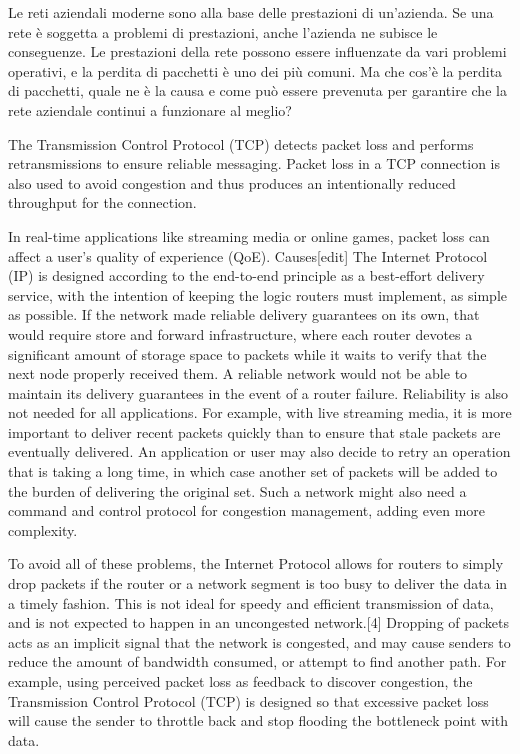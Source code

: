 Le reti aziendali moderne sono alla base delle prestazioni di un’azienda. Se una rete è soggetta a problemi di prestazioni, anche l’azienda ne subisce le conseguenze. Le prestazioni della rete possono essere influenzate da vari problemi operativi, e la perdita di pacchetti è uno dei più comuni. Ma che cos’è la perdita di pacchetti, quale ne è la causa e come può essere prevenuta per garantire che la rete aziendale continui a funzionare al meglio?

The Transmission Control Protocol (TCP) detects packet loss and performs retransmissions to ensure reliable messaging. Packet loss in a TCP connection is also used to avoid congestion and thus produces an intentionally reduced throughput for the connection.

In real-time applications like streaming media or online games, packet loss can affect a user's quality of experience (QoE).
Causes[edit]
The Internet Protocol (IP) is designed according to the end-to-end principle as a best-effort delivery service, with the intention of keeping the logic routers must implement, as simple as possible. If the network made reliable delivery guarantees on its own, that would require store and forward infrastructure, where each router devotes a significant amount of storage space to packets while it waits to verify that the next node properly received them. A reliable network would not be able to maintain its delivery guarantees in the event of a router failure. Reliability is also not needed for all applications. For example, with live streaming media, it is more important to deliver recent packets quickly than to ensure that stale packets are eventually delivered. An application or user may also decide to retry an operation that is taking a long time, in which case another set of packets will be added to the burden of delivering the original set. Such a network might also need a command and control protocol for congestion management, adding even more complexity.

To avoid all of these problems, the Internet Protocol allows for routers to simply drop packets if the router or a network segment is too busy to deliver the data in a timely fashion. This is not ideal for speedy and efficient transmission of data, and is not expected to happen in an uncongested network.[4] Dropping of packets acts as an implicit signal that the network is congested, and may cause senders to reduce the amount of bandwidth consumed, or attempt to find another path. For example, using perceived packet loss as feedback to discover congestion, the Transmission Control Protocol (TCP) is designed so that excessive packet loss will cause the sender to throttle back and stop flooding the bottleneck point with data.

